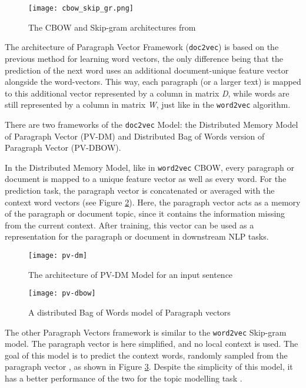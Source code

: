 \documentclass[fontsize=12pt,a4paper,twoside,openany]{scrbook}
\begin{document}
\begin{figure}[h]
\centering
\texttt{[image: cbow\_skip\_gr.png]}
\caption{The CBOW and Skip-gram architectures from \parencite{TMikolov13}}
\label{fig:cbow_skip_gr}
\end{figure}

The architecture of Paragraph Vector Framework (\verb|doc2vec|) is based on the previous method for learning word vectors, the only difference being that the prediction of the next word uses an additional document-unique feature vector alongside the word-vectors. This way, each paragraph (or a larger text) is mapped to this additional vector represented by a column in matrix \emph{D}, while words are still represented by a column in matrix \emph{W}, just like in the \verb|word2vec| algorithm. 

There are two frameworks of the \verb|doc2vec| Model: the Distributed Memory Model of Paragraph Vector (PV-DM) and Distributed Bag of Words version of Paragraph Vector (PV-DBOW).

In the Distributed Memory Model, like in \verb|word2vec| CBOW, every paragraph or document is mapped to a unique feature vector as well as every word. For the prediction task, the paragraph vector is concatenated or averaged with the context word vectors (see Figure \ref{fig:pv-dm}). Here, the paragraph vector acts as a memory of the paragraph or document topic, since it contains the information missing from the current context. After training, this vector can be used as a representation for the paragraph or document in downstream NLP tasks.

\begin{figure}[!ht]
\centering
\texttt{[image: pv-dm]}
\caption{The architecture of PV-DM Model for an input sentence}
\label{fig:pv-dm}
\end{figure}

\begin{figure}[!ht]
\centering
\texttt{[image: pv-dbow]}
\caption{A distributed Bag of Words model of Paragraph vectors}
\label{fig:pv-dbow}
\end{figure}

The other Paragraph Vectors framework is similar to the \verb|word2vec| Skip-gram model. The paragraph vector is here simplified, and no local context is used. The goal of this model is to predict the context words, randomly sampled from the paragraph vector \parencite{Le14}, as shown in Figure \ref{fig:pv-dbow}. Despite the simplicity of this model, it has a better performance of the two for the topic modelling task \parencite{Angelov20}.
\end{document}
